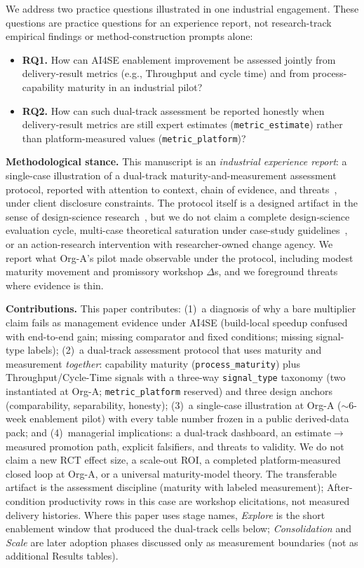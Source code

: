 \documentclass[10pt,conference]{IEEEtran}
\begin{document}
We address two practice questions illustrated in one industrial engagement.
These questions are practice questions for an experience report, not research-track empirical findings or method-construction prompts alone:
\begin{itemize}
\item \textbf{RQ1.} How can AI4SE enablement improvement be assessed jointly from delivery-result metrics (e.g., Throughput and cycle time) and from process-capability maturity in an industrial pilot?
\item \textbf{RQ2.} How can such dual-track assessment be reported honestly when delivery-result metrics are still expert estimates (\texttt{metric\_estimate}) rather than platform-measured values (\texttt{metric\_platform})?
\end{itemize}

\textbf{Methodological stance.}
This manuscript is an \emph{industrial experience report}: a single-case illustration of a dual-track maturity-and-measurement assessment protocol, reported with attention to context, chain of evidence, and threats~\cite{Runeson2009CaseStudy}, under client disclosure constraints.
The protocol itself is a designed artifact in the sense of design-science research~\cite{Hevner2004DSR}, but we do not claim a complete design-science evaluation cycle, multi-case theoretical saturation under case-study guidelines~\cite{Runeson2009CaseStudy}, or an action-research intervention with researcher-owned change agency.
We report what Org-A's pilot made observable under the protocol, including modest maturity movement and promissory workshop $\Delta$s, and we foreground threats where evidence is thin.

\textbf{Contributions.} This paper contributes:
(1)~a diagnosis of why a bare multiplier claim fails as management evidence under AI4SE (build-local speedup confused with end-to-end gain; missing comparator and fixed conditions; missing signal-type labels);
(2)~a dual-track assessment protocol that uses maturity and measurement \emph{together}: capability maturity (\texttt{process\_maturity}) plus Throughput/Cycle-Time signals with a three-way \texttt{signal\_type} taxonomy (two instantiated at Org-A; \texttt{metric\_platform} reserved) and three design anchors (comparability, separability, honesty);
(3)~a single-case illustration at Org-A ($\sim$6-week enablement pilot) with every table number frozen in a public derived-data pack; and
(4)~managerial implications: a dual-track dashboard, an estimate$\rightarrow$measured promotion path, explicit falsifiers, and threats to validity.
We do not claim a new RCT effect size, a scale-out ROI, a completed platform-measured closed loop at Org-A, or a universal maturity-model theory.
The transferable artifact is the assessment discipline (maturity with labeled measurement); After-condition productivity rows in this case are workshop elicitations, not measured delivery histories.
Where this paper uses stage names, \emph{Explore} is the short enablement window that produced the dual-track cells below; \emph{Consolidation} and \emph{Scale} are later adoption phases discussed only as measurement boundaries (not as additional Results tables).
\end{document}
